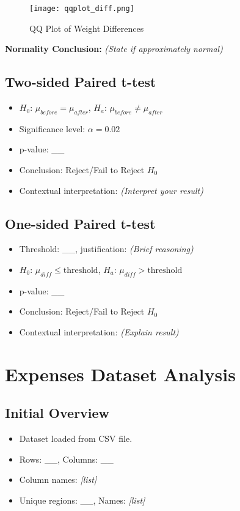 \documentclass{article}
\begin{document}
\begin{figure}[H]
    \centering
    \texttt{[image: qqplot\_diff.png]} %
    \caption{QQ Plot of Weight Differences}
\end{figure}

\textbf{Normality Conclusion:} \textit{(State if approximately normal)}

\subsection{Two-sided Paired t-test}
\begin{itemize}
    \item \(H_0\): \(\mu_{before} = \mu_{after}\), \(H_a\): \(\mu_{before} \neq \mu_{after}\)
    \item Significance level: \(\alpha = 0.02\)
    \item p-value: \_\_
    \item Conclusion: Reject/Fail to Reject \(H_0\)
    \item Contextual interpretation: \textit{(Interpret your result)}
\end{itemize}

\subsection{One-sided Paired t-test}
\begin{itemize}
    \item Threshold: \_\_, justification: \textit{(Brief reasoning)}
    \item \(H_0\): \(\mu_{diff} \leq \text{threshold}\), \(H_a\): \(\mu_{diff} > \text{threshold}\)
    \item p-value: \_\_
    \item Conclusion: Reject/Fail to Reject \(H_0\)
    \item Contextual interpretation: \textit{(Explain result)}
\end{itemize}

\section{Expenses Dataset Analysis}

\subsection{Initial Overview}
\begin{itemize}
    \item Dataset loaded from CSV file.
    \item Rows: \_\_, Columns: \_\_
    \item Column names: \textit{[list]}
    \item Unique regions: \_\_, Names: \textit{[list]}
\end{itemize}
\end{document}
